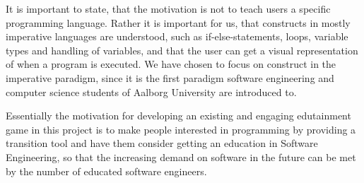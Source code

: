 It is important to state, that the motivation is not to teach users a specific programming language.
Rather it is important for us, that constructs in mostly imperative languages are understood, such as if-else-statements, loops, variable types and handling of variables, and that the user can get a visual representation of when a program is executed. We have chosen to focus on construct in the imperative paradigm, since it is the first paradigm software engineering and computer science students of Aalborg University are introduced to.\newline

Essentially the motivation for developing an existing and engaging edutainment game in this project is to make people interested in programming by providing a transition tool and have them consider getting an education in Software Engineering, so that the increasing demand on software in the future can be met by the number of educated software engineers.\citep{idaArtikelMangel}